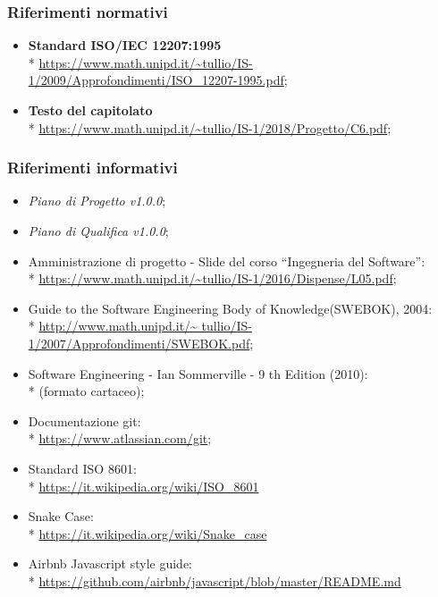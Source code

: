 \subsubsection{Riferimenti normativi}
\begin{itemize}
	\item \textbf{Standard ISO/IEC 12207:1995} \\* 
		\url{https://www.math.unipd.it/~tullio/IS-1/2009/Approfondimenti/ISO_12207-1995.pdf};
	\item \textbf{Testo del capitolato} \\*  
		\url{https://www.math.unipd.it/~tullio/IS-1/2018/Progetto/C6.pdf};
\end{itemize}

\subsubsection{Riferimenti informativi}
\begin{itemize}
	\item \textit{Piano di Progetto v1.0.0};
	\item \textit{Piano di Qualifica v1.0.0};
	\item Amministrazione di progetto - Slide del corso “Ingegneria del
		Software”: \\*
		\url{https://www.math.unipd.it/~tullio/IS-1/2016/Dispense/L05.pdf};
	\item Guide to the Software Engineering Body of Knowledge(SWEBOK), 2004: \\*
		\url{http://www.math.unipd.it/~	tullio/IS-1/2007/Approfondimenti/SWEBOK.pdf};
	\item Software Engineering - Ian Sommerville - 9 th Edition (2010): \\*
		(formato cartaceo);
	\item Documentazione git: \\*
		\url{https://www.atlassian.com/git};
	\item Standard ISO 8601: \\*
		\url{https://it.wikipedia.org/wiki/ISO_8601}
	\item Snake Case: \\*
		\url{https://it.wikipedia.org/wiki/Snake_case}
	\item Airbnb Javascript style guide: \\*
		\url{https://github.com/airbnb/javascript/blob/master/README.md}
		
	
\end{itemize}
